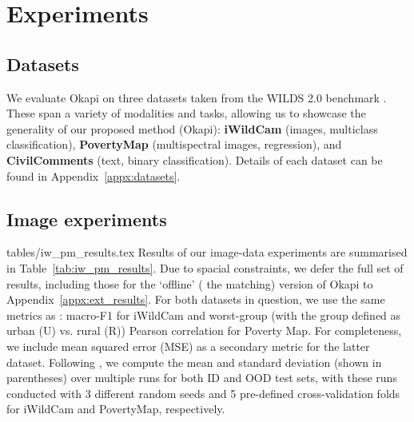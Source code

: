 \section{Experiments}\label{sec:exps}
%
\subsection{Datasets}\label{sec:exps_datasets} 
%
We evaluate Okapi on three datasets taken from the WILDS 2.0 benchmark \citep{SagWeiLeeGaoetal22}. 
%
These span a variety of modalities and tasks, allowing us to showcase the generality of our
proposed method (Okapi): \textbf{iWildCam} (images, multiclass classification), \textbf{PovertyMap}
(multispectral images, regression), and \textbf{CivilComments} (text, binary classification). 
%
Details of each dataset can be found in Appendix~\ref{appx:datasets}.
%
\subsection{Image experiments}
%
{tables/iw_pm_results.tex}
%
Results of our image-data experiments are summarised in Table~\ref{tab:iw_pm_results}. 
%
Due to spacial constraints, we defer the full set of results, including those for the `offline'
(\wrt{} the matching) version of Okapi to Appendix~\ref{appx:ext_results}. 
%
For both datasets in question, we use the same metrics as \citet{SagWeiLeeGaoetal22}: macro-F1 for
iWildCam and worst-group (with the group defined as urban (U) vs. rural (R)) Pearson correlation
for Poverty Map. 
%
For completeness, we include mean squared error (MSE) as a secondary metric for the latter dataset.
%
Following \citet{SagWeiLeeGaoetal22}, we compute the mean and standard deviation (shown in
parentheses) over multiple runs for both \ac{ID} and \ac{OOD} test sets, with these runs conducted
with 3 different random seeds and 5 pre-defined cross-validation folds for iWildCam and PovertyMap,
respectively.

